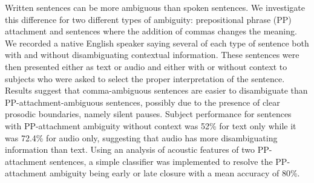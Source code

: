 Written sentences can be more ambiguous than spoken sentences. We investigate this difference for two different types of ambiguity: prepositional phrase (PP) attachment and sentences where the addition of commas changes the meaning. We recorded a native English speaker saying several of each type of sentence both with and without disambiguating contextual information.  These sentences were then presented either as text or audio and either with or without context to subjects who were asked to select the proper interpretation of the sentence. Results suggest that comma-ambiguous sentences are easier to disambiguate than PP-attachment-ambiguous sentences, possibly due to the presence of clear prosodic boundaries, namely silent pauses. Subject performance for sentences with PP-attachment ambiguity without context was 52\% for text only while it was 72.4\% for audio only, suggesting that audio has more disambiguating information than text. Using an analysis of acoustic features of two PP-attachment sentences, a simple classifier was implemented to resolve the PP-attachment ambiguity being early or late closure with a mean accuracy of 80\%.
